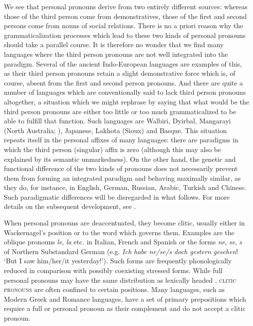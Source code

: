 \label{page43}We see that personal pronouns derive from two entirely different sources: whereas those of the third person come from demonstratives, those of the first and second persons come from nouns of social relations. There is no a priori reason why the grammaticalization processes which lead to these two kinds of personal pronouns should take a parallel course. It is therefore no wonder that we find many languages where the third person pronouns are not well integrated into the paradigm. Several of the ancient Indo-European languages are examples of this, as their third person pronouns retain a slight demonstrative force which is, of course, absent from the first and second person pronouns. And there are quite a number of languages which are conventionally said to lack third person pronouns altogether, a situation which we might rephrase by saying that what would be the third person pronouns are either too little or too much grammaticalized to be able to fulfill that function. Such languages are Walbiri, Dyirbal, Mangarayi (North Australia; \citealt[99]{Merlan1982}), Japanese, Lakhota (Sioux) and Basque. This situation repeats itself in the personal affixes of many languages: there are paradigms in which the third person (singular) affix is zero (although this may also be explained by its semantic unmarkedness). On the other hand, the genetic and functional difference of the two kinds of pronouns does not necessarily prevent them from forming an integrated paradigm and behaving maximally similar, as they do, for instance, in English, German, Russian, Arabic, Turkish and Chinese. Such paradigmatic differences will be disregarded in what follows. For more details on the subsequent development, see \citet[§§6.2 and 7.1]{Lehmann1982b}.

When personal pronouns are deaccentuated, they become clitic, usually either in Wackernagel's position or to the word which governs them. Examples are the oblique pronouns \textit{le}, \textit{la} etc. in Italian, French and Spanish or the forms \textit{ne}, \textit{se}, \textit{s} of Northern Substandard %
German (e.g. \textit{Ich habe ne/se/s doch gestern gesehen}! ‘But I saw him/her/it yesterday!’). Such forms are frequently phonologically reduced in comparison with possibly coexisting stressed forms.\label{page44b} While full personal pronouns may have the same distribution as lexically headed \nps, \textsc{clitic pronouns} are often confined to certain positions. Many languages, such as Modern Greek and Romance languages, have a set of primary prepositions which require a full \np or personal pronoun as their complement and do not accept a clitic pronoun.

